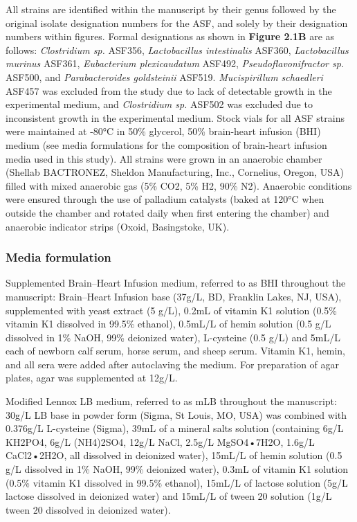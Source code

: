 \documentclass[11pt,onecolumn,notitlepage,openany,twoside]{book}
\begin{document}
\begin{refsection}
All strains are identified within the manuscript by their genus followed by the original isolate designation numbers for the ASF, and solely by their designation numbers within figures. Formal designations as shown in \textbf{Figure 2.1B} are as follows: \textit{Clostridium sp.} ASF356, \textit{Lactobacillus intestinalis} ASF360, \textit{Lactobacillus murinus} ASF361, \textit{Eubacterium plexicaudatum} ASF492, \textit{Pseudoflavonifractor sp.} ASF500, and \textit{Parabacteroides goldsteinii} ASF519. \textit{Mucispirillum schaedleri} ASF457 was excluded from the study due to lack of detectable growth in the experimental medium, and \textit{Clostridium sp.} ASF502 was excluded due to inconsistent growth in the experimental medium. Stock vials for all ASF strains were maintained at -80°C in 50\% glycerol, 50\% brain-heart infusion (BHI) medium (see media formulations for the composition of brain-heart infusion media used in this study). All strains were grown in an anaerobic chamber (Shellab BACTRONEZ, Sheldon Manufacturing, Inc., Cornelius, Oregon, USA) filled with mixed anaerobic gas (5\% CO2, 5\% H2, 90\% N2). Anaerobic conditions were ensured through the use of palladium catalysts (baked at 120°C when outside the chamber and rotated daily when first entering the chamber) and anaerobic indicator strips (Oxoid, Basingstoke, UK).

\subsubsection{Media formulation}

Supplemented Brain–Heart Infusion medium, referred to as BHI throughout the manuscript: Brain–Heart Infusion base (37g/L, BD, Franklin Lakes, NJ, USA), supplemented with yeast extract (5 g/L), 0.2mL of vitamin K1 solution (0.5\% vitamin K1 dissolved in 99.5\% ethanol), 0.5mL/L of hemin solution (0.5 g/L dissolved in 1\% NaOH, 99\% deionized water), L-cysteine (0.5 g/L) and 5mL/L each of newborn calf serum, horse serum, and sheep serum. Vitamin K1, hemin, and all sera were added after autoclaving the medium. For preparation of agar plates, agar was supplemented at 12g/L.

Modified Lennox LB medium, referred to as mLB throughout the manuscript:  30g/L LB base in powder form (Sigma, St Louis, MO, USA) was combined with 0.376g/L L-cysteine (Sigma), 39mL of a mineral salts solution (containing 6g/L KH2PO4, 6g/L (NH4)2SO4, 12g/L NaCl, 2.5g/L MgSO4•7H2O, 1.6g/L CaCl2•2H2O, all dissolved in deionized water), 15mL/L of hemin solution (0.5 g/L dissolved in 1\% NaOH, 99\% deionized water), 0.3mL of vitamin K1 solution (0.5\% vitamin K1 dissolved in 99.5\% ethanol), 15mL/L of lactose solution (5g/L lactose dissolved in deionized water) and 15mL/L of tween 20 solution (1g/L tween 20 dissolved in deionized water).


\end{refsection}
\end{document}
